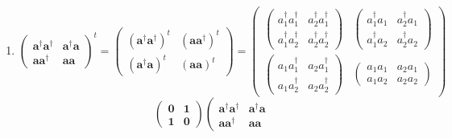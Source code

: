 \documentclass[aps,preprint]{revtex4}
\begin{document}
\begin{enumerate}
\item 
\begin{equation}
\left( 
\begin{array}{cc}
\boldsymbol{a}^{\dagger }\boldsymbol{a}^{\dagger } & \boldsymbol{a}^{\dagger
}\boldsymbol{a} \\ 
\boldsymbol{aa}^{\dagger } & \boldsymbol{aa}%
\end{array}%
\right) ^{t}=\left( 
\begin{array}{cc}
\left( \boldsymbol{a}^{\dagger }\boldsymbol{a}^{\dagger }\right) ^{t} & 
\left( \boldsymbol{aa}^{\dagger }\right) ^{t} \\ 
\left( \boldsymbol{a}^{\dagger }\boldsymbol{a}\right) ^{t} & \left( 
\boldsymbol{aa}\right) ^{t}%
\end{array}%
\right) =\left( 
\begin{array}{cc}
\left( 
\begin{array}{cc}
a_{1}^{\dagger }a_{1}^{\dagger } & a_{2}^{\dagger }a_{1}^{\dagger } \\ 
a_{1}^{\dagger }a_{2}^{\dagger } & a_{2}^{\dagger }a_{2}^{\dagger }%
\end{array}%
\right) & \left( 
\begin{array}{cc}
a_{1}^{\dagger }a_{1} & a_{2}^{\dagger }a_{1} \\ 
a_{1}^{\dagger }a_{2} & a_{2}^{\dagger }a_{2}%
\end{array}%
\right) \\ 
\left( 
\begin{array}{cc}
a_{1}a_{1}^{\dagger } & a_{2}a_{1}^{\dagger } \\ 
a_{1}a_{2}^{\dagger } & a_{2}a_{2}^{\dagger }%
\end{array}%
\right) & \left( 
\begin{array}{cc}
a_{1}a_{1} & a_{2}a_{1} \\ 
a_{1}a_{2} & a_{2}a_{2}%
\end{array}%
\right)%
\end{array}%
\right)
\end{equation}%
\begin{equation}
\left( 
\begin{array}{cc}
\boldsymbol{0} & \boldsymbol{1} \\ 
\boldsymbol{1} & \boldsymbol{0}%
\end{array}%
\right) \left( 
\begin{array}{cc}
\boldsymbol{a}^{\dagger }\boldsymbol{a}^{\dagger } & \boldsymbol{a}^{\dagger
}\boldsymbol{a} \\ 
\boldsymbol{aa}^{\dagger } & \boldsymbol{aa}%

\end{array}
\end{equation}
\end{enumerate}
\end{document}
